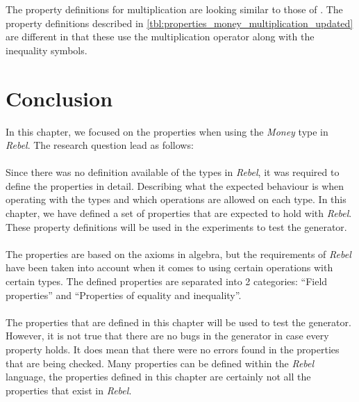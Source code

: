 \FloatBarrier\noindent
The property definitions for multiplication are looking similar to those of
. The property definitions described
in \autoref{tbl:properties_money_multiplication_updated} are different in that
these use the multiplication operator along with the inequality symbols.

\section{Conclusion}
In this chapter, we focused on the properties when using the \textit{Money}
type in \textit{Rebel}. The research question lead as follows:\rqOne\\
\\
Since there was no definition available of the types in \textit{Rebel}, it was
required to define the properties in detail. Describing what the expected
behaviour is when operating with the types and which operations are allowed on
each type. In this chapter, we have defined a set of properties that are
expected to hold with \textit{Rebel}. These property definitions will be used in the experiments to test the generator.\\
\\
The properties are based on the axioms in algebra, but the requirements of
\textit{Rebel} have been taken into account when it comes to using certain
operations with certain types. The defined properties are separated into 2
categories: ``Field properties'' and ``Properties of equality and inequality''.
\\
\\
The properties that are defined in this chapter will be used to test the
generator. However, it is not true that there are no bugs in the generator in
case every property holds. It does mean that there were no errors found in the
properties that are being checked. Many properties can be defined within the
\textit{Rebel} language, the properties defined in this chapter are certainly
not all the properties that exist in \textit{Rebel}.

